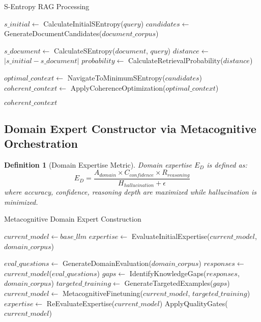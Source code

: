 \documentclass[12pt,a4paper]{article}
\newtheorem{definition}[theorem]{Definition}
\begin{document}
\begin{algorithm}
\begin{algorithmic}[1]
\begin{algorithm}
\caption{S-Entropy RAG Processing}
\begin{algorithmic}[1]
    \STATE $s\_initial \leftarrow$ CalculateInitialSEntropy($query$)
    \STATE $candidates \leftarrow$ GenerateDocumentCandidates($document\_corpus$)
    
        \STATE $s\_document \leftarrow$ CalculateSEntropy($document$, $query$)
        \STATE $distance \leftarrow$ $|s\_initial - s\_document|$
        \STATE $probability \leftarrow$ CalculateRetrievalProbability($distance$)
    \ENDFOR
    
    \STATE $optimal\_context \leftarrow$ NavigateToMinimumSEntropy($candidates$)
    \STATE $coherent\_context \leftarrow$ ApplyCoherenceOptimization($optimal\_context$)
    
    \RETURN $coherent\_context$
\ENDPROCEDURE
\end{algorithmic}
\end{algorithm}

\subsection{Domain Expert Constructor via Metacognitive Orchestration}

\begin{definition}[Domain Expertise Metric]
Domain expertise $E_D$ is defined as:
\begin{equation}
E_D = \frac{A_{domain} \times C_{confidence} \times R_{reasoning}}{H_{hallucination} + \epsilon}
\end{equation}
where accuracy, confidence, reasoning depth are maximized while hallucination is minimized.
\end{definition}

\begin{algorithm}
\caption{Metacognitive Domain Expert Construction}
\begin{algorithmic}[1]
    \STATE $current\_model \leftarrow base\_llm$
    \STATE $expertise \leftarrow$ EvaluateInitialExpertise($current\_model$, $domain\_corpus$)
    
        \STATE $eval\_questions \leftarrow$ GenerateDomainEvaluation($domain\_corpus$)
        \STATE $responses \leftarrow$ $current\_model$($eval\_questions$)
        \STATE $gaps \leftarrow$ IdentifyKnowledgeGaps($responses$, $domain\_corpus$)
        \STATE $targeted\_training \leftarrow$ GenerateTargetedExamples($gaps$)
        \STATE $current\_model \leftarrow$ MetacognitiveFinetuning($current\_model$, $targeted\_training$)
        \STATE $expertise \leftarrow$ ReEvaluateExpertise($current\_model$)
        \STATE ApplyQualityGates($current\_model$)
    \ENDWHILE
    

\end{algorithmic}
\end{algorithm}
\end{algorithmic}
\end{algorithm}
\end{document}
